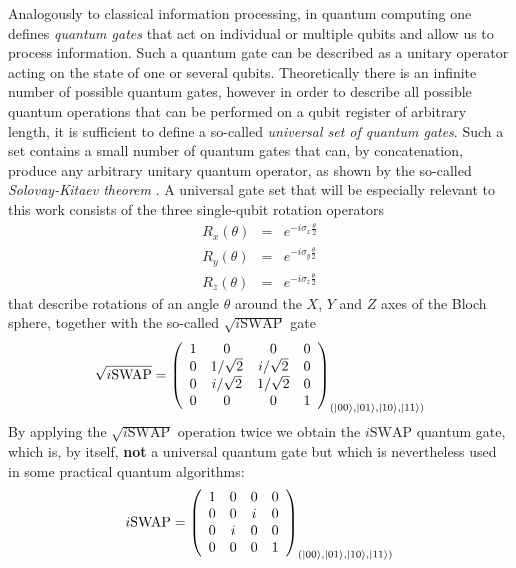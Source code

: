 Analogously to classical information processing, in quantum computing one defines {\it quantum gates} that act on individual or multiple qubits and allow us to process information. Such a quantum gate can be described as a unitary operator acting on the state of one or several qubits. Theoretically there is an infinite number of possible quantum gates, however in order to describe all possible quantum operations that can be performed on a qubit register of arbitrary length, it is sufficient to define a so-called {\it universal set of quantum gates}. Such a set contains a small number of quantum gates that can, by concatenation, produce any arbitrary unitary quantum operator, as shown by the so-called {\it Solovay-Kitaev theorem} \citep{nielsen_quantum_2000,dawson_solovay-kitaev_2005}. A universal gate set that will be especially relevant to this work consists of the three single-qubit rotation operators
%
\begin{eqnarray}
   R_x(\theta)  & = & e^{-i\sigma_x\frac{\theta}{2}} \\ 
   R_y(\theta)  & = & e^{-i\sigma_y\frac{\theta}{2}} \\ 
   R_z(\theta)  & = & e^{-i\sigma_z\frac{\theta}{2}} 
\label{eq:universal_single_qubit_gates}
\end{eqnarray}
%
that describe rotations of an angle $\theta$ around the $X$, $Y$ and $Z$ axes of the Bloch sphere, together with the so-called $\sqrt{i\mathrm{SWAP}}$ gate
%
\begin{equation}
\sqrt{i\mathrm{SWAP}} = \left( \begin{array}{cccc} 1 & 0 & 0 & 0 \\ 0 & 1/\sqrt{2} & i/\sqrt{2} & 0 \\ 0 & i/\sqrt{2} & 1/\sqrt{2} & 0 \\ 0 & 0 & 0 & 1  \end{array}  \right)_{(\left| 00 \right>,\left| 01 \right>,\left| 10 \right>,\left| 11 \right>)}
\end{equation}
%
By applying the $\sqrt{i\mathrm{SWAP}}$ operation twice we obtain the $i\mathrm{SWAP}$ quantum gate, which is, by itself, \textbf{not} a universal quantum gate but which is nevertheless used in some practical quantum algorithms:
%
\begin{equation}
i\mathrm{SWAP} = \left( \begin{array}{cccc} 1 & 0 & 0 & 0 \\ 0 & 0 & i & 0 \\ 0 & i & 0 & 0 \\ 0 & 0 & 0 & 1  \end{array}  \right)_{(\left| 00 \right>,\left| 01 \right>,\left| 10 \right>,\left| 11 \right>)}
\end{equation}
%

